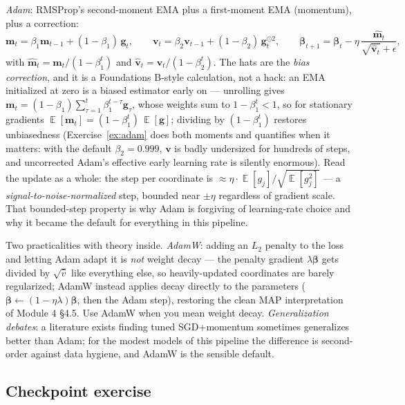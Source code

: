 \documentclass[11pt]{article}
\numberwithin{equation}{section}
\theoremstyle{plain}
\theoremstyle{definition}
\theoremstyle{remark}
\newcounter{exercise}
\DeclareMathOperator{\E}{\mathbb{E}}
\newcommand{\bbeta}{\bm{\beta}}
\begin{document}
\emph{Adam}: RMSProp's second-moment EMA plus a first-moment EMA (momentum), plus a correction:
\begin{equation}
\bm{m}_t = \beta_1 \bm{m}_{t-1} + (1 - \beta_1)\, \bm{g}_t,
\qquad
\bm{v}_t = \beta_2 \bm{v}_{t-1} + (1 - \beta_2)\, \bm{g}_t^{\odot 2},
\qquad
\bbeta_{t+1} = \bbeta_t - \eta\, \frac{\hat{\bm m}_t}{\sqrt{\hat{\bm v}_t} + \epsilon},
\label{eq:adam}
\end{equation}
with $\hat{\bm m}_t = \bm{m}_t / (1 - \beta_1^t)$ and $\hat{\bm v}_t = \bm{v}_t / (1 - \beta_2^t)$. The hats are the \emph{bias correction}, and it is a Foundations B-style calculation, not a hack: an EMA initialized at zero is a biased estimator early on --- unrolling gives $\bm{m}_t = (1-\beta_1)\sum_{\tau=1}^t \beta_1^{t-\tau}\bm{g}_\tau$, whose weights sum to $1 - \beta_1^t < 1$, so for stationary gradients $\E[\bm m_t] = (1 - \beta_1^t)\,\E[\bm g]$; dividing by $(1-\beta_1^t)$ restores unbiasedness (Exercise~\ref{ex:adam} does both moments and quantifies when it matters: with the default $\beta_2 = 0.999$, $\bm v$ is badly undersized for hundreds of steps, and uncorrected Adam's effective early learning rate is silently enormous). Read the update as a whole: the step per coordinate is $\approx \eta \cdot \E[g_j]/\sqrt{\E[g_j^2]}$ --- a \emph{signal-to-noise-normalized} step, bounded near $\pm\eta$ regardless of gradient scale. That bounded-step property is why Adam is forgiving of learning-rate choice and why it became the default for everything in this pipeline.

Two practicalities with theory inside. \emph{AdamW}: adding an $L_2$ penalty to the loss and letting Adam adapt it is \emph{not} weight decay --- the penalty gradient $\lambda\bbeta$ gets divided by $\sqrt{\hat v}$ like everything else, so heavily-updated coordinates are barely regularized; AdamW instead applies decay directly to the parameters ($\bbeta \leftarrow (1 - \eta\lambda)\bbeta$, then the Adam step), restoring the clean MAP interpretation of Module 4 \S4.5. Use AdamW when you mean weight decay. \emph{Generalization debates}: a literature exists finding tuned SGD+momentum sometimes generalizes better than Adam; for the modest models of this pipeline the difference is second-order against data hygiene, and AdamW is the sensible default.


\subsection*{Checkpoint exercise}
\end{document}
